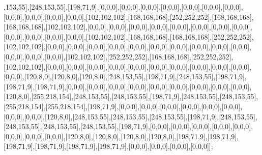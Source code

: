 ,153,55],[248,153,55],[198,71,9],[0,0,0],[0,0,0],[0,0,0],[0,0,0],[0,0,0],[0,0,0],[0,0,0],[0,0,0],[0,0,0],[0,0,0],[0,0,0],[102,102,102],[168,168,168],[252,252,252],[168,168,168],[168,168,168],[102,102,102],[0,0,0],[0,0,0],[0,0,0],[0,0,0],[0,0,0],[0,0,0],[0,0,0],[0,0,0],[0,0,0],[0,0,0],[0,0,0],[0,0,0],[102,102,102],[168,168,168],[168,168,168],[252,252,252],[102,102,102],[0,0,0],[0,0,0],[0,0,0],[0,0,0],[0,0,0],[0,0,0],[0,0,0],[0,0,0],[0,0,0],[0,0,0],[0,0,0],[0,0,0],[0,0,0],[102,102,102],[252,252,252],[168,168,168],[252,252,252],[102,102,102],[0,0,0],[0,0,0],[0,0,0],[0,0,0],[0,0,0],[0,0,0],[0,0,0],[0,0,0],[0,0,0],[0,0,0],[0,0,0],[120,8,0],[120,8,0],[120,8,0],[248,153,55],[198,71,9],[248,153,55],[198,71,9],[198,71,9],[198,71,9],[0,0,0],[0,0,0],[0,0,0],[0,0,0],[0,0,0],[0,0,0],[0,0,0],[0,0,0],[0,0,0],[120,8,0],[255,218,154],[248,153,55],[248,153,55],[198,71,9],[248,153,55],[248,153,55],[255,218,154],[255,218,154],[198,71,9],[0,0,0],[0,0,0],[0,0,0],[0,0,0],[0,0,0],[0,0,0],[0,0,0],[0,0,0],[120,8,0],[248,153,55],[248,153,55],[248,153,55],[198,71,9],[248,153,55],[248,153,55],[248,153,55],[248,153,55],[198,71,9],[0,0,0],[0,0,0],[0,0,0],[0,0,0],[0,0,0],[0,0,0],[0,0,0],[0,0,0],[120,8,0],[120,8,0],[120,8,0],[120,8,0],[198,71,9],[198,71,9],[198,71,9],[198,71,9],[198,71,9],[198,71,9],[0,0,0],[0,0,0],[0,0,0],[0,0,0]];

